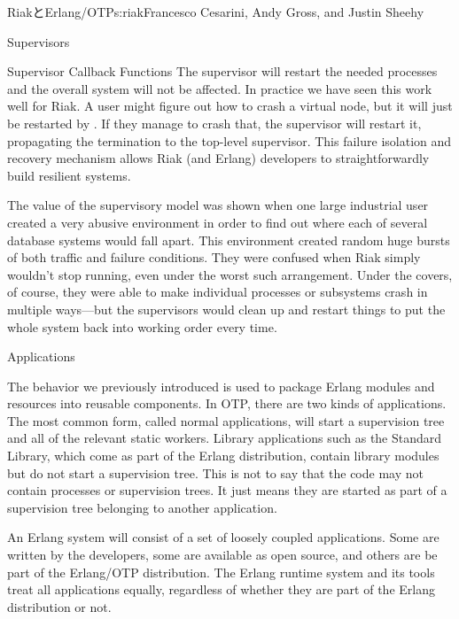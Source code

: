 \begin{aosachapter}{RiakとErlang/OTP}{s:riak}{Francesco Cesarini, Andy Gross, and Justin Sheehy}
\begin{aosasect1}{Supervisors}
\begin{aosasect2}{Supervisor Callback Functions}
The supervisor will restart the needed processes and the overall
system will not be affected. In practice we have seen this work
well for Riak.  A user might figure out how to crash a virtual node,
but it will just be restarted by .  If
they manage to crash that, the  supervisor will
restart it, propagating the termination to the top-level supervisor.
This failure isolation and recovery mechanism allows Riak (and Erlang)
developers to straightforwardly build resilient systems.

The value of the supervisory model was shown when one large industrial
user created a very abusive environment in order to find out where
each of several database systems would fall apart.  This environment
created random huge bursts of both traffic and failure conditions.
They were confused when Riak simply wouldn't stop running, even under
the worst such arrangement.  Under the covers, of course, they were
able to make individual processes or subsystems crash in multiple
ways---but the supervisors would clean up and restart things to put
the whole system back into working order every time.

\end{aosasect2}

\begin{aosasect2}{Applications}

The  behavior we previously introduced is used to
package Erlang modules and resources into reusable components. In OTP,
there are two kinds of applications. The most common form, called
normal applications, will start a supervision tree and all of the
relevant static workers. Library applications such as the Standard
Library, which come as part of the Erlang distribution, contain
library modules but do not start a supervision tree. This is not to
say that the code may not contain processes or supervision trees. It
just means they are started as part of a supervision tree belonging to
another application.

An Erlang system will consist of a set of loosely coupled
applications. Some are written by the developers, some are available
as open source, and others are be part of the Erlang/OTP
distribution. The Erlang runtime system and its tools treat all
applications equally, regardless of whether they are part of the
Erlang distribution or not.

\end{aosasect2}

\end{aosasect1}


\end{aosachapter}
